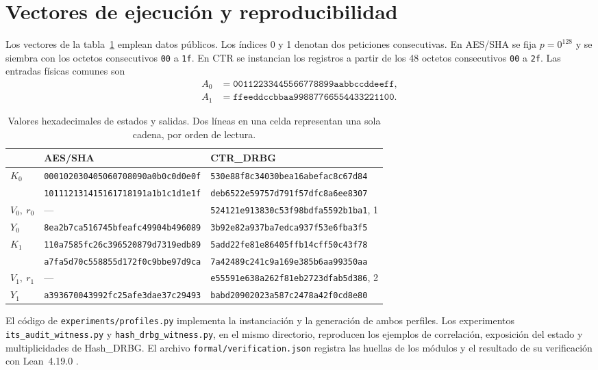 \documentclass[11pt,a4paper]{article}
\begin{document}
\section{Vectores de ejecución y reproducibilidad}\label{app:vectores}
Los vectores de la tabla~\ref{tab:vectores} emplean datos públicos. Los índices 0 y 1 denotan dos peticiones consecutivas. En AES/SHA se fija \(p=0^{128}\) y se siembra con los octetos consecutivos \texttt{00} a \texttt{1f}. En CTR se instancian los registros a partir de los 48 octetos consecutivos \texttt{00} a \texttt{2f}. Las entradas físicas comunes son
\begin{align*}
 A_0&=\mathtt{00112233445566778899aabbccddeeff},\\
 A_1&=\mathtt{ffeeddccbbaa99887766554433221100}.
\end{align*}
\begin{table}[htbp]\centering\small
\caption{Valores hexadecimales de estados y salidas. Dos líneas en una celda representan una sola cadena, por orden de lectura.}\label{tab:vectores}
\begin{tabular}{@{}lll@{}}\toprule
 & AES/SHA & CTR\_DRBG\\\midrule
\(K_0\) & \texttt{000102030405060708090a0b0c0d0e0f}&\texttt{530e88f8c34030bea16abefac8c67d84}\\
 &\texttt{101112131415161718191a1b1c1d1e1f}&\texttt{deb6522e59757d791f57dfc8a6ee8307}\\
\(V_0,\ r_0\)& --- & \texttt{524121e913830c53f98bdfa5592b1ba1}, 1\\
\(Y_0\)&\texttt{8ea2b7ca516745bfeafc49904b496089}&\texttt{3b92e82a937ba7edca937f53e6fba3f5}\\
\(K_1\)&\texttt{110a7585fc26c396520879d7319edb89}&\texttt{5add22fe81e86405ffb14cff50c43f78}\\
 &\texttt{a7fa5d70c558855d172f0c9bbe97d9ca}&\texttt{7a42489c241c9a169e385b6aa99350aa}\\
\(V_1,\ r_1\)& --- & \texttt{e55591e638a262f81eb2723dfab5d386}, 2\\
\(Y_1\)&\texttt{a393670043992fc25afe3dae37c29493}&\texttt{babd20902023a587c2478a42f0cd8e80}\\\bottomrule
\end{tabular}
\end{table}
El código de \texttt{experiments/profiles.py} implementa la instanciación y la generación de ambos perfiles. Los experimentos \texttt{its\_audit\_witness.py} y \texttt{hash\_drbg\_witness.py}, en el mismo directorio, reproducen los ejemplos de correlación, exposición del estado y multiplicidades de Hash\_DRBG. El archivo \texttt{formal/verification.json} registra las huellas de los módulos y el resultado de su verificación con Lean~4.19.0 \cite{expediente}.
\end{document}
